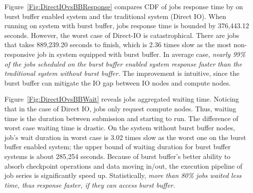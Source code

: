 Figure~\ref{Fig:DirectIOvsBBResponse} compares CDF of jobs response
time by on burst buffer enabled system and the traditional system (Direct IO).
When running on system with burst buffer,
jobs response time is bounded by 376,443.12 seconds.
However, the worst case of 
Direct-IO is catastrophical.
There are jobs that takes 889,239.20 seconds to finish,
which is 2.36 times slow as the most non-responsive job
in system equipped with burst buffer.
In average case, \textit{nearly 99\% of the jobs scheduled on the burst buffer enabled system
response faster than the traditional system without burst buffer.}
The improvement is intuitive, since the burst buffer can mitigate the IO gap between
IO nodes and compute nodes.



Figure~\ref{Fig:DirectIOvsBBWait} reveals jobs aggregated waiting time.
Noticing that in the case of Direct IO, jobs only request compute nodes.
Thus, waiting time is the duration between submission
and starting to run.
The difference of worst case waiting time is drastic.
On the system without burst buffer nodes, job's wait duration in worst case is 3.02 times
slow as the worst one on the burst buffer enabled system;
the upper bound of waiting duration for burst buffer systems is about 285,254 seconds.
Because of burst buffer's better ability to
absorb checkpoint operations and data moving in/out,
the execution pipeline of job series is significantly speed up.
Statistically, \textit{more than 80\% jobs waited less time, thus response faster,
if they can access burst buffer.}

